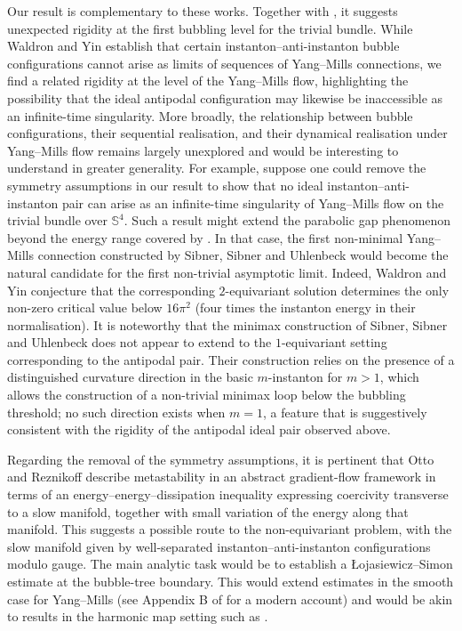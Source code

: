 \documentclass[11pt,a4paper]{article}
\numberwithin{equation}{section}
\theoremstyle{plain}
\theoremstyle{remark}
\begin{document}
Our result is complementary to these works. Together with \cite{waldron2026yangmillsequationnearinstantonantiinstanton}, it suggests unexpected rigidity at the first bubbling level for the trivial bundle. While Waldron and Yin establish that certain instanton--anti-instanton bubble configurations cannot arise as limits of sequences of Yang–Mills connections, we find a related rigidity at the level of the Yang–Mills flow, highlighting the possibility that the ideal antipodal configuration may likewise be inaccessible as an infinite-time singularity. More broadly, the relationship between bubble configurations, their sequential realisation, and their dynamical realisation under Yang–Mills flow remains largely unexplored and would be interesting to understand in greater generality. For example, suppose one could remove the symmetry assumptions in our result to show that no ideal instanton--anti-instanton pair can arise as an infinite-time singularity of Yang--Mills flow on the trivial bundle over $\mathbb S^4$. Such a result might extend the parabolic gap phenomenon beyond the energy range covered by \cite{dayaprema2026parabolicgaptheoremsyangmills}. In that case, the first non-minimal Yang--Mills connection constructed by Sibner, Sibner and Uhlenbeck \cite{SibnerSibnerUhlenbeck1989} would become the natural candidate for the first non-trivial asymptotic limit. Indeed, Waldron and Yin conjecture that the corresponding $2$-equivariant solution determines the only non-zero critical value below $16\pi^2$ (four times the instanton energy in their normalisation). It is noteworthy that the minimax construction of Sibner, Sibner and Uhlenbeck does not appear to extend to the $1$-equivariant setting corresponding to the antipodal pair. Their construction relies on the presence of a distinguished curvature direction in the basic $m$-instanton for $m>1$, which allows the construction of a non-trivial minimax loop below the bubbling threshold; no such direction exists when $m=1$, a feature that is suggestively consistent with the rigidity of the antipodal ideal pair observed above.

Regarding the removal of the symmetry assumptions, it is pertinent that Otto and Reznikoff \cite{OttoReznikoff2006} describe metastability in an abstract gradient-flow framework in terms of an energy--energy--dissipation inequality expressing coercivity transverse to a slow manifold, together with small variation of the energy along that manifold. This suggests a possible route to the non-equivariant problem, with the slow manifold given by well-separated instanton--anti-instanton configurations modulo gauge. The main analytic task would be to establish a \L ojasiewicz--Simon estimate at the bubble-tree boundary. This would extend estimates in the smooth case for Yang--Mills (see Appendix B of \cite{dayaprema2026parabolicgaptheoremsyangmills} for a modern account) and would be akin to results in the harmonic map setting such as \cite{Rupflin2024Lojasiewicz}.
\end{document}
